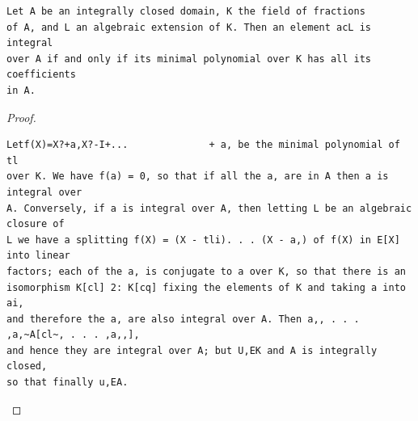 \begin{theorem}\label{mcrt-auto-theorem-9-2}\uses{}
\begin{verbatim}
Let A be an integrally closed domain, K the field of fractions
of A, and L an algebraic extension of K. Then an element acL is integral
over A if and only if its minimal polynomial over K has all its coefficients
in A.
\end{verbatim}
\end{theorem}
\begin{proof}
\begin{verbatim}
Letf(X)=X?+a,X?-I+...              + a, be the minimal polynomial of tl
over K. We have f(a) = 0, so that if all the a, are in A then a is integral over
A. Conversely, if a is integral over A, then letting L be an algebraic closure of
L we have a splitting f(X) = (X - tli). . . (X - a,) of f(X) in E[X] into linear
factors; each of the a, is conjugate to a over K, so that there is an
isomorphism K[cl] 2: K[cq] fixing the elements of K and taking a into ai,
and therefore the a, are also integral over A. Then a,, . . . ,a,~A[cl~, . . . ,a,,],
and hence they are integral over A; but U,EK and A is integrally closed,
so that finally u,EA.
\end{verbatim}
\end{proof}


